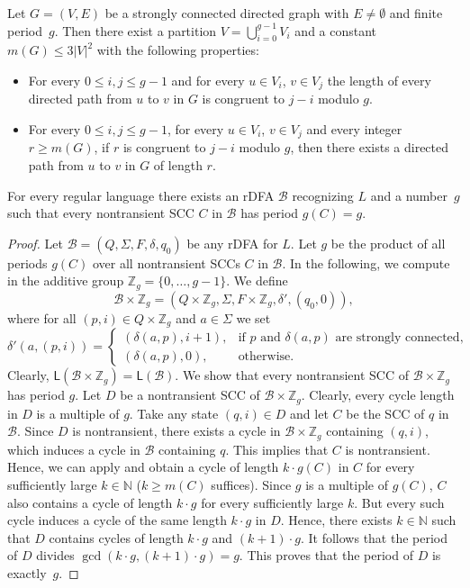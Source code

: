 \documentclass{article}\usepackage[a4paper,margin=20mm]{geometry}
\newcommand{\N}{\mathbb{N}}
\newcommand{\Z}{\mathbb{Z}}
\newcommand{\B}{\mathcal{B}}
\renewcommand{\L}{\mathsf{L}}
\renewcommand{\geq}{\geqslant}
\renewcommand{\leq}{\leqslant}
\begin{document}
\begin{lemma} \label{lemma-alon}
Let $G = (V, E)$ be a strongly connected directed graph with $E \neq \emptyset$ and finite period~$g$. 
Then there exist a partition $V = \bigcup_{i=0}^{g-1} V_i$ and a constant $m(G) \leq  3|V|^2$ with the following properties:
\begin{itemize}
\item For every $0 \leq i,j \leq g-1$ and for every $u \in V_i$, $v \in V_j$ the length of every directed path from $u$ to 
$v$ in $G$ is congruent to $j-i$ modulo $g$.
\item For every $0 \leq i,j \leq g-1$, for every $u \in V_i$, $v \in V_j$ and every 
integer $r \geq m(G)$, if $r$ is congruent to $j-i$ modulo $g$, then there exists a directed path from $u$ to $v$ in $G$ of length $r$.
\end{itemize}
\end{lemma}

\begin{lemma}
\label{lem:uni-per}
For every regular language there exists an rDFA $\B$ recognizing $L$ and a number~$g$
such that every nontransient SCC $C$ in $\B$ has period $g(C) = g$.
\end{lemma}

\begin{proof}
Let $\B = (Q,\Sigma,F,\delta,q_0)$ be any rDFA for $L$.
Let $g$ be the product of all periods $g(C)$ over all nontransient SCCs $C$ in $\B$.
In the following, we compute in the additive group $\Z_g = \{0,\ldots,g-1\}$.
We define
\[
	\B \times \Z_g = (Q \times \Z_g, \Sigma, F \times \Z_g, \delta', (q_0,0)),
\]
where for all $(p,i) \in Q \times \Z_g$ and $a \in \Sigma$ we set
\[
	\delta'(a,(p,i)) = \begin{cases}
	(\delta(a,p),i+1), & \text{if } p \text{ and } \delta(a,p) \text{ are strongly connected}, \\
	(\delta(a,p),0), & \text{otherwise.}
	\end{cases}
\]
Clearly, $\L(\B \times \Z_g) = \L(\B)$.
We show that every nontransient SCC of $\B \times \Z_g$ has period $g$.
Let $D$ be a nontransient  SCC of $\B \times \Z_g$.
Clearly, every cycle length in $D$ is a multiple of $g$.
Take any state $(q,i) \in D$ and let $C$ be the SCC of $q$ in $\B$.
Since $D$ is nontransient, there exists a cycle in $\B \times \Z_g$
containing $(q,i)$,
which induces a cycle in $\B$ containing $q$.
This implies that $C$ is nontransient.
Hence, we can apply  and obtain a cycle of length $k \cdot g(C)$ in $C$
for every sufficiently large $k \in \N$ ($k \geq m(C)$ suffices).
Since $g$ is a multiple of $g(C)$, $C$ also contains a cycle of length 
$k \cdot g$ for every sufficiently large $k$. But every such cycle induces
a cycle of the same length $k \cdot g$ in $D$.
Hence, there exists $k \in \N$ such that 
$D$ contains cycles of length $k \cdot g$ and $(k+1) \cdot g$.
It follows that the period of  $D$ divides $\gcd(k \cdot g, (k+1) \cdot g) = g$.
This proves that the period of $D$ is exactly~$g$.
\end{proof}
\end{document}
